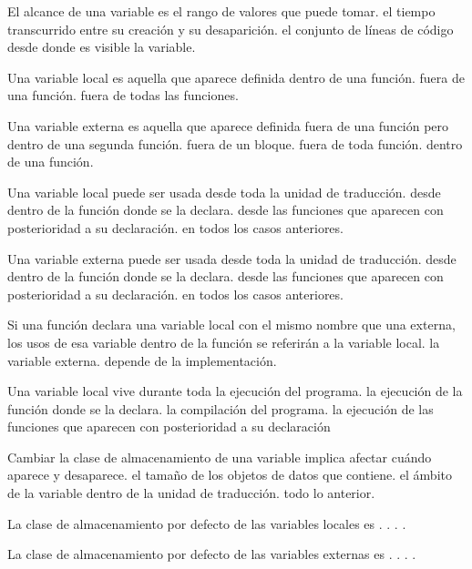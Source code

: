 
\begin{preguntas}
\label{sec:tc-variables-preg}
\question El alcance de una variable es
\choice el rango de valores que puede tomar.
\choice el tiempo transcurrido entre su creación y su desaparición.
\correctchoice el conjunto de líneas de código desde donde es visible la variable.

\question Una variable local es aquella que aparece definida
\correctchoice dentro de una función.
\choice fuera de una función.
\choice fuera de todas las funciones.

\question Una variable externa es aquella que aparece definida
\choice fuera de una función pero dentro de una segunda función.
\choice fuera de un bloque.
\correctchoice fuera de toda función.
\choice dentro de una función.

\question Una variable local puede ser usada
\choice desde toda la unidad de traducción.
\correctchoice desde dentro de la función donde se la declara.
\choice desde las funciones que aparecen con posterioridad a su declaración.
\choice en todos los casos anteriores.

\question Una variable externa puede ser usada
\choice desde toda la unidad de traducción.
\choice desde dentro de la función donde se la declara.
\correctchoice desde las funciones que aparecen con posterioridad a su declaración.
\choice en todos los casos anteriores.

\question Si una función declara una variable local con el mismo nombre que una externa, los usos de esa variable dentro de la función se referirán a
\correctchoice la variable local.
\choice la variable externa.
\choice depende de la implementación.

\question Una variable local vive durante
\choice toda la ejecución del programa.
\correctchoice la ejecución de la función donde se la declara.
\choice la compilación del programa.
\choice la ejecución de las funciones que aparecen con posterioridad a su declaración

\question Cambiar la clase de almacenamiento de una variable implica afectar 
\correctchoice cuándo aparece y desaparece.
\choice el tamaño de los objetos de datos que contiene.
\choice el ámbito de la variable dentro de la unidad de traducción.
\choice todo lo anterior.

\question La clase de almacenamiento por defecto de las variables locales es
\correctchoice {}.
\choice {}.
\choice {}.
\choice {}.

\question La clase de almacenamiento por defecto de las variables externas es
\choice {}.
\correctchoice {}.
\choice {}.
\choice {}.


\end{preguntas}

